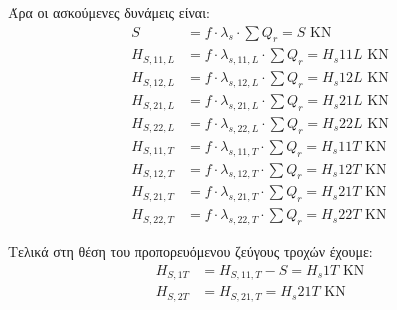 Άρα οι ασκούμενες δυνάμεις είναι:
\begin{align*}
    S                &= f \cdot λ_s \cdot \sum{Q_r} = {{ S }} \text{ KN} \\
    H_{S,11,L}       &= f \cdot λ_{s,11,L} \cdot \sum{Q_r} = {{ H_s11L }} \text{ KN} \\
    H_{S,12,L}       &= f \cdot λ_{s,12,L} \cdot \sum{Q_r} = {{ H_s12L }} \text{ KN} \\
    H_{S,21,L}       &= f \cdot λ_{s,21,L} \cdot \sum{Q_r} = {{ H_s21L }} \text{ KN} \\
    H_{S,22,L}       &= f \cdot λ_{s,22,L} \cdot \sum{Q_r} = {{ H_s22L }} \text{ KN} \\
    H_{S,11,T}       &= f \cdot λ_{s,11,T} \cdot \sum{Q_r} = {{ H_s11T }} \text{ KN} \\
    H_{S,12,T}       &= f \cdot λ_{s,12,T} \cdot \sum{Q_r} = {{ H_s12T }} \text{ KN} \\
    H_{S,21,T}       &= f \cdot λ_{s,21,T} \cdot \sum{Q_r} = {{ H_s21T }} \text{ KN} \\
    H_{S,22,T}       &= f \cdot λ_{s,22,T} \cdot \sum{Q_r} = {{ H_s22T }} \text{ KN}
\end{align*}

Τελικά στη θέση του προπορευόμενου ζεύγους τροχών έχουμε:
\begin{align*}
    H_{S,1T} &= H_{S,11,T} - S = {{ H_s1T }} \text{ KN} \\
    H_{S,2T} &= H_{S,21,T} = {{ H_s21T }} \text{ KN}
\end{align*}
